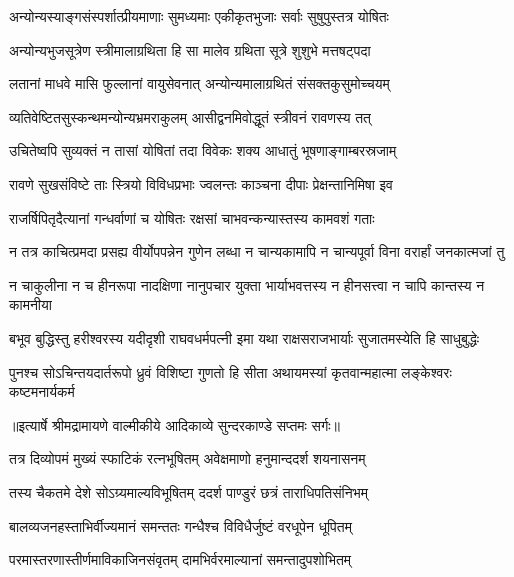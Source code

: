 \twolineshloka
{अन्योन्यस्याङ्गसंस्पर्शात्प्रीयमाणाः सुमध्यमाः}
{एकीकृतभुजाः सर्वाः सुषुपुस्तत्र योषितः} %

\twolineshloka
{अन्योन्यभुजसूत्रेण स्त्रीमालाग्रथिता हि सा}
{मालेव ग्रथिता सूत्रे शुशुभे मत्तषट्पदा} %

\twolineshloka
{लतानां माधवे मासि फुल्लानां वायुसेवनात्}
{अन्योन्यमालाग्रथितं संसक्तकुसुमोच्चयम्} %

\twolineshloka
{व्यतिवेष्टितसुस्कन्थमन्योन्यभ्रमराकुलम्}
{आसीद्वनमिवोद्धूतं स्त्रीवनं रावणस्य तत्} %

\twolineshloka
{उचितेष्वपि सुव्यक्तं न तासां योषितां तदा}
{विवेकः शक्य आधातुं भूषणाङ्गाम्बरस्रजाम्} %

\twolineshloka
{रावणे सुखसंविष्टे ताः स्त्रियो विविधप्रभाः}
{ज्वलन्तः काञ्चना दीपाः प्रेक्षन्तानिमिषा इव} %

\twolineshloka
{राजर्षिपितृदैत्यानां गन्धर्वाणां च योषितः}
{रक्षसां चाभवन्कन्यास्तस्य कामवशं गताः} %

\fourlineindentedshloka
{न तत्र काचित्प्रमदा प्रसह्य}
{वीर्योपपन्नेन गुणेन लब्धा}
{न चान्यकामापि न चान्यपूर्वा}
{विना वरार्हां जनकात्मजां तु} %

\fourlineindentedshloka
{न चाकुलीना न च हीनरूपा}
{नादक्षिणा नानुपचार युक्ता}
{भार्याभवत्तस्य न हीनसत्त्वा}
{न चापि कान्तस्य न कामनीया} %

\fourlineindentedshloka
{बभूव बुद्धिस्तु हरीश्वरस्य}
{यदीदृशी राघवधर्मपत्नी}
{इमा यथा राक्षसराजभार्याः}
{सुजातमस्येति हि साधुबुद्धेः} %

\fourlineindentedshloka
{पुनश्च सोऽचिन्तयदार्तरूपो}
{ध्रुवं विशिष्टा गुणतो हि सीता}
{अथायमस्यां कृतवान्महात्मा}
{लङ्केश्वरः कष्टमनार्यकर्म} %


{॥इत्यार्षे श्रीमद्रामायणे वाल्मीकीये आदिकाव्ये सुन्दरकाण्डे सप्तमः सर्गः॥}


\twolineshloka
{तत्र दिव्योपमं मुख्यं स्फाटिकं रत्नभूषितम्}
{अवेक्षमाणो हनुमान्ददर्श शयनासनम्} %

\twolineshloka
{तस्य चैकतमे देशे सोऽग्र्यमाल्यविभूषितम्}
{ददर्श पाण्डुरं छत्रं ताराधिपतिसंनिभम्} %

\twolineshloka
{बालव्यजनहस्ताभिर्वीज्यमानं समन्ततः}
{गन्धैश्च विविधैर्जुष्टं वरधूपेन धूपितम्} %

\twolineshloka
{परमास्तरणास्तीर्णमाविकाजिनसंवृतम्}
{दामभिर्वरमाल्यानां समन्तादुपशोभितम्} %

